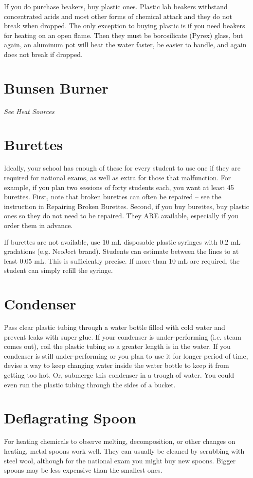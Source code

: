 If you do purchase beakers, 
buy plastic ones. 
Plastic lab beakers withstand concentrated acids 
and most other forms of chemical attack 
and they do not break when dropped. 
The only exception to buying plastic is 
if you need beakers for heating on an open flame. 
Then they must be borosilicate (Pyrex) glass, 
but again, 
an aluminum pot will heat the water faster, 
be easier to handle, 
and again does not break if dropped.

\section{Bunsen Burner}
\textit{See Heat Sources}

\section{Burettes}
Ideally, 
your school has enough of these for every student 
to use one if they are required for national exams, 
as well as extra for those that malfunction. 
For example, 
if you plan two sessions of forty students each, 
you want at least 45 burettes. 
First, 
note that broken burettes can often be repaired – 
see the instruction in Repairing Broken Burettes. 
Second, 
if you buy burettes, 
buy plastic ones so they do not need to be repaired. 
They ARE available, 
especially if you order them in advance.

If burettes are not available, 
use 10 mL disposable plastic syringes with 0.2 mL gradations (e.g. 
NeoJect brand). 
Students can estimate between the lines to at least 0.05 mL. 
This is sufficiently precise. 
If more than 10 mL are required, 
the student can simply refill the syringe.

\section{Condenser}
Pass clear plastic tubing through a water bottle filled 
with cold water and prevent leaks with super glue. 
If your condenser is under-performing (i.e. 
steam comes out), 
coil the plastic tubing so a greater length is in the water. 
If you condenser is still under-performing 
or you plan to use it for longer period of time, 
devise a way to keep changing water inside the water bottle 
to keep it from getting too hot. 
Or, 
submerge this condenser in a trough of water. 
You could even run the plastic tubing through the sides of a bucket.

\section{Deflagrating Spoon}
For heating chemicals to observe melting, 
decomposition, 
or other changes on heating, 
metal spoons work well. 
They can usually be cleaned by scrubbing with steel wool, 
although for the national exam you might buy new spoons. 
Bigger spoons may be less expensive than the smallest ones.

